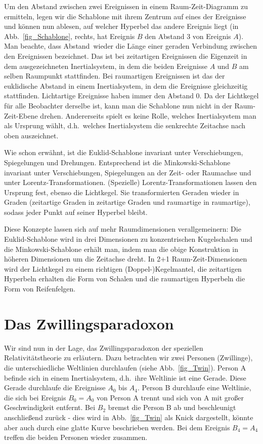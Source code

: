 Um den Abstand zwischen zwei Ereignissen in einem Raum-Zeit-Diagramm zu
ermitteln, legen wir die Schablone mit ihrem Zentrum auf eines der Ereignisse und k\"onnen
nun ablesen, auf welcher Hyperbel das andere Ereignis liegt (in Abb.\ \ref{fig_Schablone}, rechts,
hat Ereignis $B$ den Abstand 3 von Ereignis $A$). Man beachte, dass \glqq Abstand\grqq\ wieder
die L\"ange einer geraden Verbindung zwischen den Ereignissen bezeichnet. Das ist bei
zeitartigen Ereignissen die Eigenzeit in dem ausgezeichneten Inertialsystem, in dem die
beiden Ereignisse $A$ und $B$ am selben Raumpunkt stattfinden. Bei raumartigen Ereignissen ist das
der euklidische Abstand in einem Inertialsystem, in dem die Ereignisse gleichzeitig stattfinden.
Lichtartige Ereignisse haben immer den Abstand 0. Da der Lichtkegel f\"ur alle Beobachter derselbe ist,
kann man die Schablone nun nicht in der Raum-Zeit-Ebene drehen.  
Andererseits spielt es keine Rolle, welches Inertialsystem
man als Ursprung w\"ahlt, d.h.\ welches Inertialsystem die senkrechte Zeitachse nach oben auszeichnet.

Wie schon erw\"ahnt, ist die Euklid-Schablone invariant unter Verschiebungen, Spiegelungen und
Drehungen. Entsprechend ist die Minkowski-Schablone invariant unter Verschiebungen, Spiegelungen
an der Zeit- oder Raumachse und unter 
Lorentz-Transformationen. (Spezielle) Lorentz-Transformationen 
lassen den Ursprung fest, ebenso die Lichtkegel. Sie transformierten Geraden wieder in Graden
(zeitartige Graden in zeitartige Graden und raumartige in raumartige), sodass jeder Punkt auf seiner
Hyperbel bleibt. 

Diese Konzepte lassen sich auf mehr Raumdimensionen verallgemeinern: Die Euklid-Schablone wird in
drei Dimensionen zu konzentrischen Kugelschalen und die Minkowski-Schablone erh\"alt man, indem 
man die obige Konstruktion in h\"oheren Dimensionen um die Zeitachse dreht. In 2+1 Raum-Zeit-Dimensionen
wird der Lichtkegel zu einem richtigen (Doppel-)Kegelmantel, die zeitartigen Hyperbeln erhalten die
Form von Schalen und die raumartigen Hyperbeln die Form von Reifenfelgen. 

\section{Das Zwillingsparadoxon}

Wir sind nun in der Lage, das Zwillingsparadoxon der speziellen
Relativit\"atstheorie zu erl\"autern. Dazu betrachten wir zwei Personen (Zwillinge),
die unterschiedliche Weltlinien durchlaufen (siehe Abb.\ \ref{fig_Twin}). Person 
A befinde sich in einem Inertialsystem, d.h.\ ihre Weltlinie ist eine Gerade. Diese
Gerade durchlaufe die Ereignisse $A_0$ bis $A_4$. Person B durchlaufe eine
Weltlinie, die sich bei Ereignis $B_0=A_0$ von Person A trennt und sich von A
mit gro\ss er Geschwindigkeit entfernt. Bei $B_2$ bremst die Person B ab und
beschleunigt anschlie\ss end zur\"uck - dies wird in Abb.\ \ref{fig_Twin} als Knick
dargestellt, k\"onnte aber auch durch eine glatte Kurve beschrieben werden. Bei dem Ereignis
$B_4=A_4$ treffen die beiden Personen wieder zusammen.  

